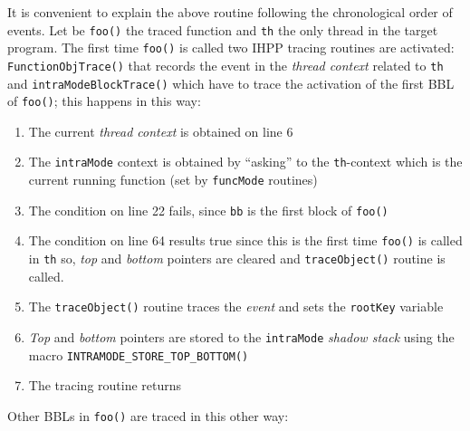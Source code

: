 \documentclass[a4paper,10pt]{report}
\begin{document}
\noindent
It is convenient to explain the above routine following the chronological
order of events. Let be \verb|foo()| the traced function and \verb|th|
the only thread in the target program. The first time \verb|foo()| is called
two IHPP tracing routines are activated: \verb|FunctionObjTrace()| that
records the event in the \emph{thread context} related to \verb|th| and
\verb|intraModeBlockTrace()| which have to trace the activation of
the first BBL of \verb|foo()|; this happens in this way:

\begin{enumerate}
\item The current \emph{thread context} is obtained on line 6
\item The \verb|intraMode| context is obtained by ``asking'' to
the \verb|th|-context which is
the current running function (set by \verb|funcMode| routines)
\item The condition on line 22 fails, since \verb|bb| is the first block of \verb|foo()|
\item The condition on line 64 results true since this is the first time
\verb|foo()| is called in \verb|th| so, \emph{top} and \emph{bottom}
pointers are cleared and \verb|traceObject()| routine is called.
\item The \verb|traceObject()| routine traces the \emph{event} and
sets the \verb|rootKey| variable
\item \emph{Top} and \emph{bottom} pointers are stored to the
\verb|intraMode| \emph{shadow stack} using the macro \verb|INTRAMODE_STORE_TOP_BOTTOM()|
\item The tracing routine returns
\end{enumerate}

\noindent
Other BBLs in \verb|foo()| are traced in this other way:
\end{document}
